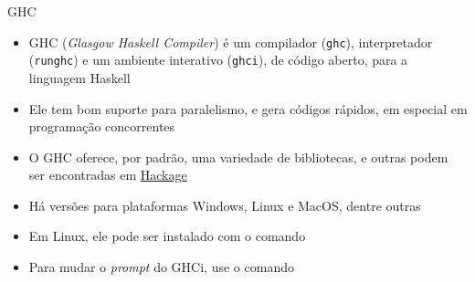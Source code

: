 \begin{frame}[fragile]{GHC}

    \begin{itemize}
        \item GHC (\textit{Glasgow Haskell Compiler}) é um compilador (\texttt{ghc}),
            interpretador (\texttt{runghc}) e um ambiente interativo (\texttt{ghci}), de 
            código aberto, para a linguagem Haskell

        \item Ele tem bom suporte para paralelismo, e gera códigos rápidos, em especial em
            programação concorrentes

        \item O GHC oferece, por padrão, uma variedade de bibliotecas, e outras podem ser 
            encontradas em \href{https://hackage.haskell.org/}{Hackage}
 
        \item Há versões para plataformas Windows, Linux e MacOS, dentre outras

        \item Em Linux, ele pode ser instalado com o comando


        \item Para mudar o \textit{prompt} do GHCi, use o comando 


    \end{itemize}

\end{frame}
